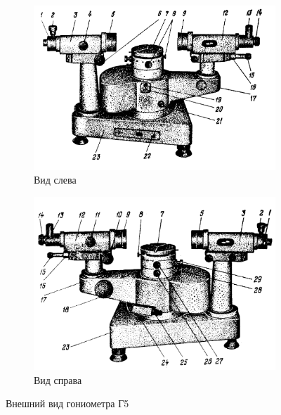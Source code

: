 \begin{figure}[h!]
    \centering
    \begin{subfigure}{0.6\textwidth}
        \centering
        \includegraphics[width=13cm]{images/gonimetr.png}
        \caption{Вид слева}
    \end{subfigure}
    \begin{subfigure}{0.6\textwidth}
        \centering
        \includegraphics[width=13cm]{images/setup2.png}
        \caption{Вид справа}
    \end{subfigure}
    \caption{Внешний вид гониометра Г5} \label{figure:gonimetr}
\end{figure}


